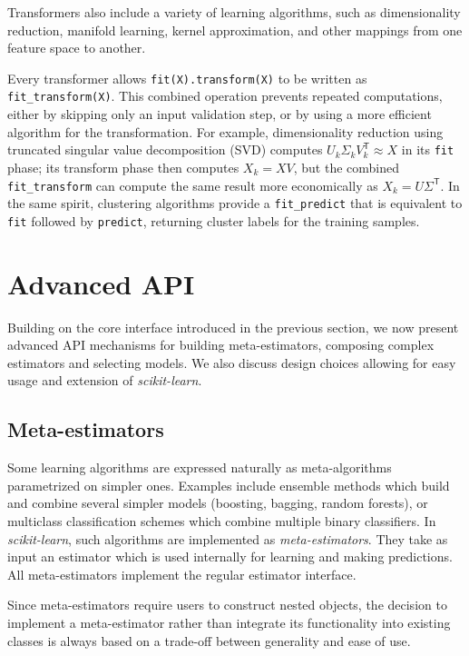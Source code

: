 \documentclass[twocolumn]{article}
\newcommand{\sklearn}{\textit{scikit-learn}\xspace}
\begin{document}
Transformers also include a variety of learning algorithms, such as
dimensionality reduction, manifold learning, kernel approximation,
and other mappings from one feature space to another.

Every transformer allows \texttt{fit(X).transform(X)}
to be written as \texttt{fit\_transform(X)}.
This combined operation prevents repeated computations,
either by skipping only an input validation step,
or by using a more efficient algorithm for the transformation.
For example, dimensionality reduction
using truncated singular value decomposition (SVD)
computes $U_k \Sigma_k V_k^\mathsf{T} \approx X$ in its \texttt{fit} phase;
its transform phase then computes $X_k = XV$,
but the combined \texttt{fit\_transform}
can compute the same result more economically as $X_k = U\Sigma^\mathsf{T}$.
In the same spirit, clustering algorithms provide a \texttt{fit\_predict}
that is equivalent to \texttt{fit} followed by \texttt{predict},
returning cluster labels for the training samples.


\section{Advanced API}

\label{sec:advanced-api}

Building on the core interface introduced in the previous section, we now
present advanced API mechanisms for building meta-estimators,
composing complex estimators and selecting models. We also discuss design
choices allowing for easy usage and extension of \sklearn.

\subsection{Meta-estimators}

Some learning algorithms are expressed naturally
as meta-algorithms parametrized on simpler ones.
Examples include ensemble methods which
build and combine several simpler models (boosting, bagging, random forests),
or multiclass classification schemes which combine multiple binary classifiers.
In \sklearn, such algorithms are implemented as \textit{meta-estimators}.
They take as input an estimator which is used
internally for learning and making predictions.
All meta-estimators implement the regular estimator interface.

Since meta-estimators require users to construct nested objects,
the decision to implement a meta-estimator
rather than integrate its functionality
into existing classes
is always based on a trade-off between generality and ease of use.
\end{document}

